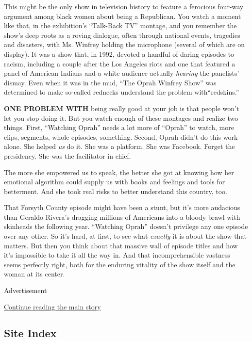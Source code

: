 This might be the only show in television history to feature a ferocious
four-way argument among black women about being a Republican. You watch
a moment like that, in the exhibition's ``Talk-Back TV'' montage, and
you remember the show's deep roots as a roving dialogue, often through
national events, tragedies and disasters, with Ms. Winfrey holding the
microphone (several of which are on display). It was a show that, in
1992, devoted a handful of daring episodes to racism, including a couple
after the Los Angeles riots and one that featured a panel of American
Indians and a white audience actually \emph{hearing} the panelists'
dismay. Even when it was in the mud, ``The Oprah Winfrey Show'' was
determined to make so-called rednecks understand the problem
with``redskins.''

\textbf{ONE PROBLEM WITH} being really good at your job is that people
won't let you stop doing it. But you watch enough of these montages and
realize two things. First, ``Watching Oprah'' needs a lot more of
``Oprah'' to watch, more clips, segments, whole episodes, something.
Second, Oprah didn't do this work alone. She helped \emph{us} do it. She
was a platform. She was Facebook. Forget the presidency. She was the
facilitator in chief.

The more she empowered us to speak, the better she got at knowing how
her emotional algorithm could supply us with books and feelings and
tools for betterment. And she took real risks to better understand this
country, too.

That Forsyth County episode might have been a stunt, but it's more
audacious than Geraldo Rivera's dragging millions of Americans into a
bloody brawl with skinheads the following year. ``Watching Oprah''
doesn't privilege any one episode over any other. So it's hard, at
first, to see what \emph{exactly} it is about the show that matters. But
then you think about that massive wall of episode titles and how it's
impossible to take it all the way in. And that incomprehensible vastness
seems perfectly right, both for the enduring vitality of the show itself
and the woman at its center.

Advertisement

\protect\hyperlink{after-bottom}{Continue reading the main story}

\hypertarget{site-index}{%
\subsection{Site Index}\label{site-index}}


